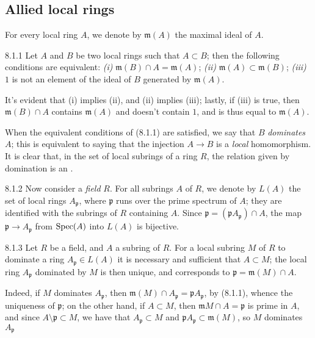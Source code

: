 \documentclass[../main.tex]{subfiles}
\begin{document}
\subsection{Allied local rings}

For every local ring $A$, we denote by $\mathfrak{m}(A)$ the maximal ideal of $A$.

\begin{cx}[Lemma]{8.1.1}
    Let $A$ and $B$ be two local rings such that $A\subset B$; then the following conditions are equivalent: \emph{(i)} $\mathfrak{m}(B)\cap A=\mathfrak{m}(A)$; \emph{(ii)} $\mathfrak{m}(A)\subset\mathfrak{m}(B)$; \emph{(iii)} $1$ is not an element of the ideal of $B$ generated by $\mathfrak{m}(A)$.
\end{cx}

It's evident that (i) implies (ii), and (ii) implies (iii); lastly, if (iii) is true, then $\mathfrak{m}(B)\cap A$ contains $\mathfrak{m}(A)$ and doesn't contain $1$, and is thus equal to $\mathfrak{m}(A)$.

When the equivalent conditions of (8.1.1) are satisfied, we say that $B$ \emph{dominates} $A$; this is equivalent to saying that the injection $A\to B$ is a \emph{local} homomorphism.
It is clear that, in the set of local subrings of a ring $R$, the relation given by domination is an .

\begin{cx}{8.1.2}
    Now consider a \emph{field} $R$.
    For all subrings $A$ of $R$, we denote by $L(A)$ the set of local rings $A_\mathfrak{p}$, where $\mathfrak{p}$ runs over the prime spectrum of $A$; they are identified with the subrings of $R$ containing $A$.
    Since $\mathfrak{p}=(\mathfrak{p}A_\mathfrak{p})\cap A$, the map $\mathfrak{p}\to A_\mathfrak{p}$ from $\operatorname*{Spec}(A)$ into $L(A)$ is bijective.
\end{cx}

\begin{cx}[Lemma]{8.1.3}
    Let $R$ be a field, and $A$ a subring of $R$.
    For a local subring $M$ of $R$ to dominate a ring $A_\mathfrak{p}\in L(A)$ it is necessary and sufficient that $A\subset M$; the local ring $A_\mathfrak{p}$ dominated by $M$ is then unique, and corresponds to $\mathfrak{p}=\mathfrak{m}(M)\cap A$.
\end{cx}

Indeed, if $M$ dominates $A_\mathfrak{p}$, then $\mathfrak{m}(M)\cap A_\mathfrak{p}=\mathfrak{p}A_\mathfrak{p}$, by (8.1.1), whence the uniqueness of $\mathfrak{p}$; on the other hand, if $A\subset M$, then $\mathfrak{m}M\cap A=\mathfrak{p}$ is prime in $A$, and since $A\setminus\mathfrak{p}\subset M$, we have that $A_\mathfrak{p}\subset M$ and $\mathfrak{p}A_\mathfrak{p}\subset\mathfrak{m}(M)$, so $M$ dominates $A_\mathfrak{p}$
\end{document}
